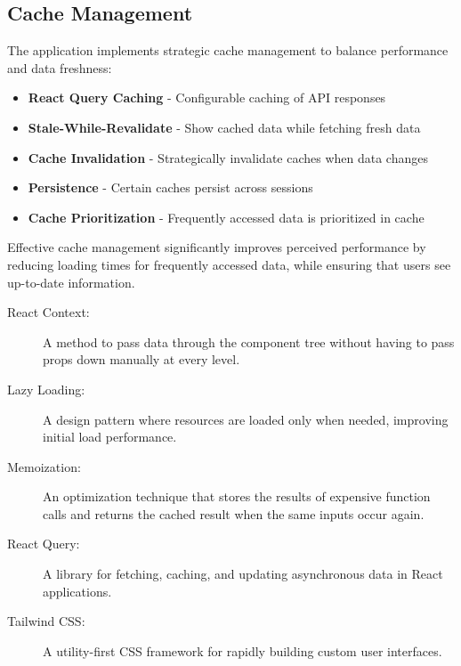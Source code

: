 \subsection{Cache Management}

The application implements strategic cache management to balance performance and data freshness:

\begin{itemize}
  \item \textbf{React Query Caching} - Configurable caching of API responses
  \item \textbf{Stale-While-Revalidate} - Show cached data while fetching fresh data
  \item \textbf{Cache Invalidation} - Strategically invalidate caches when data changes
  \item \textbf{Persistence} - Certain caches persist across sessions
  \item \textbf{Cache Prioritization} - Frequently accessed data is prioritized in cache
\end{itemize}

Effective cache management significantly improves perceived performance by reducing loading times for frequently accessed data, while ensuring that users see up-to-date information.

\begin{mdframed}[
  linewidth=0.5pt,
  frametitle={Terminology},
  frametitlefont=\normalfont\bfseries,
  backgroundcolor=gray!10,
  roundcorner=4pt,
  skipabove=7pt,
  skipbelow=7pt
]
\begin{description}
  \item[React Context:] A method to pass data through the component tree without having to pass props down manually at every level.
  \item[Lazy Loading:] A design pattern where resources are loaded only when needed, improving initial load performance.
  \item[Memoization:] An optimization technique that stores the results of expensive function calls and returns the cached result when the same inputs occur again.
  \item[React Query:] A library for fetching, caching, and updating asynchronous data in React applications.
  \item[Tailwind CSS:] A utility-first CSS framework for rapidly building custom user interfaces.
\end{description}
\end{mdframed} 